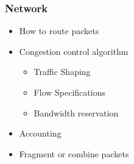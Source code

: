 \subsubsection{Network}\label{subsubsec:Network_Protocols}
\begin{itemize}
\item How to route packets
\item Congestion control algorithm
\begin{itemize}
\item Traffic Shaping
\item Flow Specifications
\item Bandwidth reservation
\end{itemize}
\item Accounting
\item Fragment or combine packets
\end{itemize}


